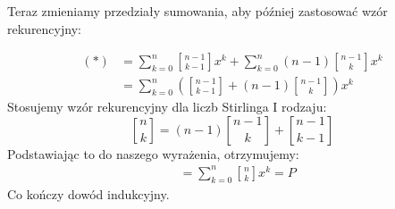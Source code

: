 \documentclass{mwart}
\begin{document}
\begin{mdframed}
\begin{enumerate}
              Teraz zmieniamy przedziały sumowania, aby później zastosować wzór rekurencyjny:

              \begin{align*}
                  (*) & = \sum_{k=0}^{n} \genfrac{[}{]}{0pt}{1}{n-1}{k-1} x^k + \sum_{k=0}^{n} (n-1) \genfrac{[}{]}{0pt}{1}{n-1}{k} x^k \\
                      & = \sum_{k=0}^{n} \left(\genfrac{[}{]}{0pt}{1}{n-1}{k-1} + (n-1) \genfrac{[}{]}{0pt}{1}{n-1}{k}\right) x^k
              \end{align*}
              Stosujemy wzór rekurencyjny dla liczb Stirlinga I rodzaju:
              $$\genfrac{[}{]}{0pt}{1}{n}{k} = (n-1)\genfrac{[}{]}{0pt}{1}{n-1}{k} + \genfrac{[}{]}{0pt}{1}{n-1}{k-1}$$
              Podstawiając to do naszego wyrażenia, otrzymujemy:
              \begin{align*}
                   & = \sum_{k=0}^{n} \genfrac{[}{]}{0pt}{1}{n}{k} x^k = P
              \end{align*}
              Co kończy dowód indukcyjny.
    \end{enumerate}
\end{mdframed}
\end{document}
